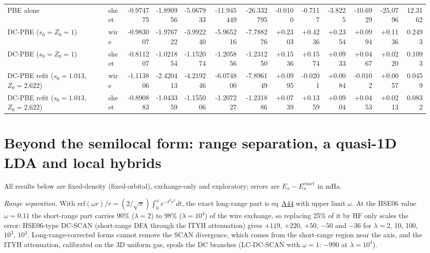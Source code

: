 \documentclass[journal=jctcce,manuscript=suppinfo]{achemso}
\begin{document}
\begin{table}[H]
{\begin{tabular}{@{}ll|rrrrr|rrrrrr@{}}
PBE alone & sheet & -0.974775 & -1.890956 & -5.067933 & -11.945449 & -26.332795 & -0.0100 & -0.7117 & -3.8225 & -10.6929 & -25.0796 & 12.3162 \\
DC-PBE ($s_0=Z_0=1$) & wire & -0.983007 & -1.976722 & -3.992240 & -5.965216 & -7.788276 & +0.2303 & +0.4236 & +0.2354 & +0.0994 & +0.1136 & 0.2493 \\
DC-PBE ($s_0=Z_0=1$) & sheet & -0.811207 & -1.021854 & -1.152074 & -1.205856 & -1.231250 & +0.1536 & +0.1574 & +0.0933 & +0.0467 & +0.0220 & 0.1093 \\
DC-PBE refit ($s_0=1.013$, $Z_0=2.622$) & wire & -1.113806 & -2.420413 & -4.219246 & -6.074800 & -7.896149 & +0.0995 & -0.0201 & +0.0084 & -0.0102 & +0.0057 & 0.0459 \\
DC-PBE refit ($s_0=1.013$, $Z_0=2.622$) & sheet & -0.890883 & -1.043359 & -1.155006 & -1.207227 & -1.231886 & +0.0739 & +0.1359 & +0.0904 & +0.0453 & +0.0213 & 0.0832 \\

\bottomrule
\end{tabular}}
\end{table}

\section{Beyond the semilocal form: range separation, a quasi-1D LDA and local hybrids}
\label{sec:dcscan-beyond}
All results below are fixed-density (fixed-orbital), exchange-only and
exploratory; errors are $E_x-E_x^{\mathrm{exact}}$ in mHa.

\emph{Range separation.}  With $\mathrm{erf}(\omega r)/r=(2/\sqrt\pi)
\int_0^\omega e^{-t^2r^2}dt$, the exact long-range part is
eq~\href{main.pdf\#equation.44}{A44} with upper limit $\omega$.  At the HSE06 value
$\omega=0.11$ the short-range part carries 90\% ($\lambda=2$) to 98\%
($\lambda=10^4$) of the wire exchange, so replacing 25\% of it by HF only
scales the error: HSE06-type DC-SCAN (short-range DFA through the ITYH
attenuation\cite{iikura2001long}) gives $+119$, $+220$, $+50$, $-50$ and
$-36$ for $\lambda=2$, 10, 100, $10^3$, $10^4$.  Long-range-corrected forms
cannot remove the SCAN divergence, which comes from the short-range region
near the axis, and the ITYH attenuation, calibrated on the 3D uniform gas,
spoils the DC branches (LC-DC-SCAN with $\omega=1$: $-990$ at $\lambda=10^4$).
\end{document}

